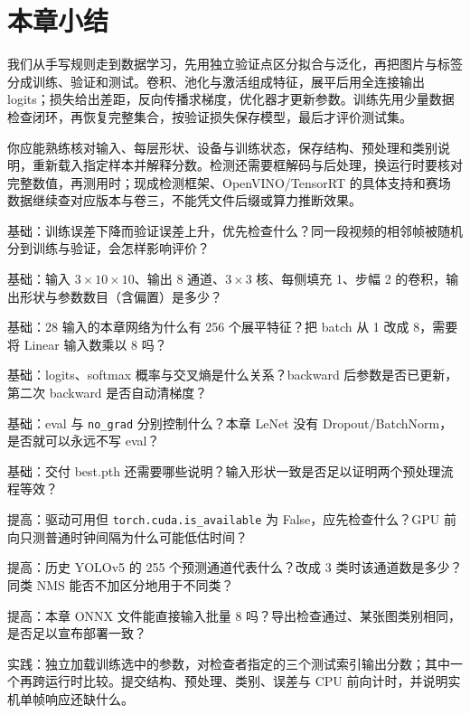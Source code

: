 \section{本章小结}
我们从手写规则走到数据学习，先用独立验证点区分拟合与泛化，再把图片与标签分成训练、验证和测试。卷积、池化与激活组成特征，展平后用全连接输出 logits；损失给出差距，反向传播求梯度，优化器才更新参数。训练先用少量数据检查闭环，再恢复完整集合，按验证损失保存模型，最后才评价测试集。

你应能熟练核对输入、每层形状、设备与训练状态，保存结构、预处理和类别说明，重新载入指定样本并解释分数。检测还需要框解码与后处理，换运行时要核对完整数值，再测用时；现成检测框架、OpenVINO/TensorRT 的具体支持和赛场数据继续查对应版本与卷三，不能凭文件后缀或算力推断效果。

\begin{problemset}
\item\label{prob:v2-dl-1} 基础：训练误差下降而验证误差上升，优先检查什么？同一段视频的相邻帧被随机分到训练与验证，会怎样影响评价？
\item\label{prob:v2-dl-2} 基础：输入 $3\times10\times10$、输出 8 通道、$3\times3$ 核、每侧填充 1、步幅 2 的卷积，输出形状与参数数目（含偏置）是多少？
\item\label{prob:v2-dl-3} 基础：28 输入的本章网络为什么有 256 个展平特征？把 batch 从 1 改成 8，需要将 Linear 输入数乘以 8 吗？
\item\label{prob:v2-dl-4} 基础：logits、softmax 概率与交叉熵是什么关系？backward 后参数是否已更新，第二次 backward 是否自动清梯度？
\item\label{prob:v2-dl-5} 基础：eval 与 \texttt{no\_grad} 分别控制什么？本章 LeNet 没有 Dropout/BatchNorm，是否就可以永远不写 eval？
\item\label{prob:v2-dl-6} 基础：交付 best.pth 还需要哪些说明？输入形状一致是否足以证明两个预处理流程等效？
\item\label{prob:v2-dl-7} 提高：驱动可用但 \texttt{torch.cuda.is\_available} 为 False，应先检查什么？GPU 前向只测普通时钟间隔为什么可能低估时间？
\item\label{prob:v2-dl-8} 提高：历史 YOLOv5 的 255 个预测通道代表什么？改成 3 类时该通道数是多少？同类 NMS 能否不加区分地用于不同类？
\item\label{prob:v2-dl-9} 提高：本章 ONNX 文件能直接输入批量 8 吗？导出检查通过、某张图类别相同，是否足以宣布部署一致？
\item\label{prob:v2-dl-10} 实践：独立加载训练选中的参数，对检查者指定的三个测试索引输出分数；其中一个再跨运行时比较。提交结构、预处理、类别、误差与 CPU 前向计时，并说明实机单帧响应还缺什么。
\end{problemset}

